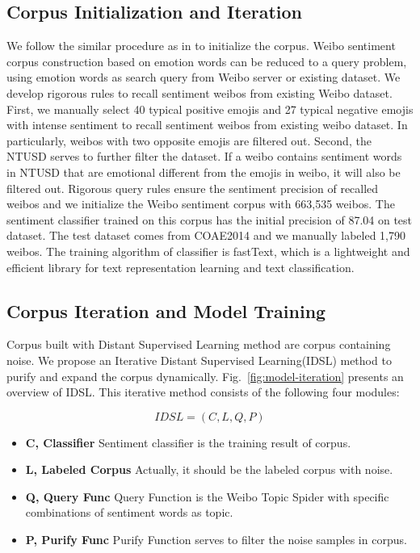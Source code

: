 \documentclass[runningheads]{llncs}
\begin{document}
\subsection{Corpus Initialization and Iteration}

We follow the similar procedure as in \cite{go2009twitter} to initialize the corpus. Weibo sentiment corpus construction based on emotion words can be reduced to a query problem, using emotion words as search query from Weibo server or existing dataset. We develop rigorous rules to recall sentiment weibos from existing Weibo dataset. First, we manually select 40 typical positive emojis and 27 typical negative emojis with intense sentiment to recall sentiment weibos from existing weibo dataset. In particularly, weibos with two opposite emojis are filtered out. Second, the NTUSD serves to further filter the dataset. If a weibo contains sentiment words in NTUSD that are emotional different from the emojis in weibo, it will also be filtered out. Rigorous query rules ensure the sentiment precision of recalled weibos and we initialize the Weibo sentiment corpus with 663,535 weibos. The sentiment classifier trained on this corpus has the initial precision of 87.04 on test dataset. The test dataset comes from COAE2014 and we manually labeled 1,790 weibos. The training algorithm of classifier is fastText\cite{joulin2016bag}, which is a lightweight and efficient library for text representation learning and text classification.

\subsection{Corpus Iteration and Model Training}
Corpus built with Distant Supervised Learning method\cite{go2009twitter,iosifidis2017large} are corpus containing noise. We propose an Iterative Distant Supervised Learning(IDSL) method to purify and expand the corpus dynamically. Fig.~\ref{fig:model-iteration} presents an overview of IDSL. This iterative method consists of the following four modules:


\begin{equation} 
IDSL = (C, L, Q, P)
\end{equation}

\begin{itemize}

\item \textbf{C, Classifier} Sentiment classifier is the training result of corpus. 

\item \textbf{L, Labeled Corpus} Actually, it should be the labeled corpus with noise.

\item \textbf{Q, Query Func} Query Function is the Weibo Topic Spider with specific combinations of sentiment words as topic.

\item \textbf{P, Purify Func} Purify Function serves to filter the noise samples in corpus.

\end{itemize}
\end{document}
